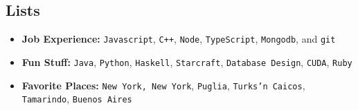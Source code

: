 \documentclass[oneside, final]{scrartcl}
\newcommand{\lang}[1]{\colorbox{light-gray}{\texttt{#1}}}
\begin{document}
\begin{center}
\section{Lists}
\begin{itemize}
	\setlength{\itemsep}{1pt}
	\setlength{\parskip}{0pt}
	\setlength{\parsep}{0pt}
	\setlength{\leftmargin}{-5mm}
	\item \textbf{Job Experience:}  \lang{Javascript}, \lang{C++}, \lang{Node}, \lang{TypeScript}, \lang{Mongodb}, and \lang{git}
	\item \textbf{Fun Stuff:}  \lang{Java}, \lang{Python}, \lang{Haskell}, \lang{Starcraft}, \lang{Database Design}, \lang{CUDA}, \lang{Ruby} \\
	\item \textbf{Favorite Places:}
        \lang{New York, New York},
        \lang{Puglia},
        \lang{Turks'n Caicos},
        \lang{Tamarindo},
        \lang{Buenos Aires}
        \\
\end{itemize}


\end{center}
\end{document}
